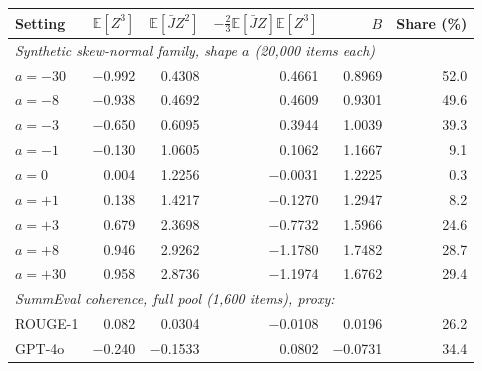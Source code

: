 \begin{tabular}{lrrrrr}
\toprule
Setting & $\mathbb{E}[Z^3]$ & $\mathbb{E}[\bar J Z^2]$ & $-\tfrac23\mathbb{E}[\bar J Z]\mathbb{E}[Z^3]$ & $B$ & Share (\%) \\
\midrule
\multicolumn{6}{l}{\textit{Synthetic skew-normal family, shape $a$ (20,000 items each)}} \\
$a=-30$ & $-$0.992 & 0.4308 & 0.4661 & 0.8969 & 52.0 \\
$a=-8$ & $-$0.938 & 0.4692 & 0.4609 & 0.9301 & 49.6 \\
$a=-3$ & $-$0.650 & 0.6095 & 0.3944 & 1.0039 & 39.3 \\
$a=-1$ & $-$0.130 & 1.0605 & 0.1062 & 1.1667 & 9.1 \\
$a=0$ & 0.004 & 1.2256 & $-$0.0031 & 1.2225 & 0.3 \\
$a=+1$ & 0.138 & 1.4217 & $-$0.1270 & 1.2947 & 8.2 \\
$a=+3$ & 0.679 & 2.3698 & $-$0.7732 & 1.5966 & 24.6 \\
$a=+8$ & 0.946 & 2.9262 & $-$1.1780 & 1.7482 & 28.7 \\
$a=+30$ & 0.958 & 2.8736 & $-$1.1974 & 1.6762 & 29.4 \\
\midrule
\multicolumn{6}{l}{\textit{SummEval coherence, full pool (1,600 items), proxy:}} \\
ROUGE-1 & 0.082 & 0.0304 & $-$0.0108 & 0.0196 & 26.2 \\
GPT-4o & $-$0.240 & $-$0.1533 & 0.0802 & $-$0.0731 & 34.4 \\
\bottomrule
\end{tabular}
